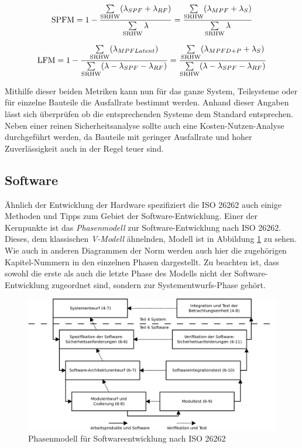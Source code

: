 \documentclass[a4paper,DIV=calc,ngerman]{scrartcl}
\begin{document}
\begin{equation}
\textnormal{SPFM} = 1 - \frac{\sum\limits_{\textnormal{SRHW}} (\lambda_{SPF} + \lambda_{RF})}{\sum\limits_{\textnormal{SRHW}} \lambda} = \frac{\sum\limits_{\textnormal{SRHW}} (\lambda_{MPF} + \lambda_{S})}{\sum\limits_{\textnormal{SRHW}} \lambda}
\label{eq:spfm}
\end{equation}

\begin{equation}
\textnormal{LFM} = 1 - \frac{\sum\limits_{\textnormal{SRHW}} (\lambda_{MPF Latent})}{\sum\limits_{\textnormal{SRHW}} (\lambda - \lambda_{SPF} - \lambda_{RF})} = \frac{\sum\limits_{\textnormal{SRHW}} (\lambda_{MPF D+P} + \lambda_{S})}{\sum\limits_{\textnormal{SRHW}} (\lambda - \lambda_{SPF} - \lambda_{RF})}
\label{eq:lfm}
\end{equation}

Mithilfe dieser beiden Metriken kann nun für das ganze System, Teilsysteme oder für einzelne Bauteile die Ausfallrate bestimmt werden. Anhand dieser Angaben lässt sich überprüfen ob die entsprechenden Systeme dem Standard entsprechen. Neben einer reinen Sicherheitsanalyse sollte auch eine Kosten-Nutzen-Analyse durchgeführt werden, da Bauteile mit geringer Ausfallrate und hoher Zuverlässigkeit auch in der Regel teuer sind.



\subsection{Software}
\label{sec:Software}
Ähnlich der Entwicklung der Hardware spezifiziert die ISO 26262 auch einige Methoden und Tipps zum Gebiet der Software-Entwicklung. Einer der Kernpunkte ist das \emph{Phasenmodell} zur Software-Entwicklung nach ISO 26262. Dieses, dem klassischen \emph{V-Modell} ähnelnden, Modell ist in Abbildung \ref{fig:software} zu sehen. Wie auch in anderen Diagrammen der Norm werden auch hier die zugehörigen Kapitel-Nummern in den einzelnen Phasen dargestellt. Zu beachten ist, dass sowohl die erste als auch die letzte Phase des Modells nicht der Software-Entwicklung zugeordnet sind, sondern zur Systementwurfs-Phase gehört.

\begin{figure}[h]
\centering
\includegraphics[width=15cm]{Abb_6_10}
\caption{Phasenmodell für Softwareentwicklung nach ISO 26262\cite{1}}
\label{fig:software}
\end{figure}
\end{document}

